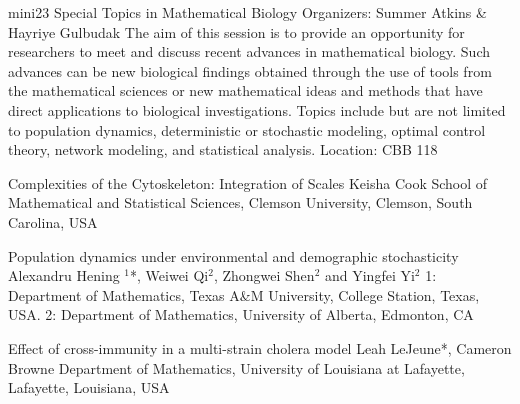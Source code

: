 \mini
{mini23}
{Special Topics in Mathematical Biology}
{Organizers: Summer Atkins \& Hayriye Gulbudak}
{The aim of this session is to provide an opportunity for researchers to meet and discuss recent advances in mathematical biology. Such advances can be new biological findings obtained through the use of tools from the mathematical sciences or  new mathematical ideas and methods that have direct applications to biological investigations. Topics include but are not limited to population dynamics, deterministic or stochastic modeling, optimal control theory, network modeling, and statistical analysis.}
{Location: CBB 118}

\begin{talks}
\item\talk
{Complexities of the Cytoskeleton: Integration of Scales}
{Keisha Cook}
{School of Mathematical and Statistical Sciences, Clemson University, Clemson, South Carolina, USA}
\item\talk
{Population dynamics under environmental and demographic stochasticity}
{Alexandru Hening {$^{1}$*}, Weiwei Qi{$^{2}$}, Zhongwei Shen{$^{2}$} and Yingfei Yi{$^{2}$}}
{1: Department of Mathematics, Texas A\&M University, College Station, Texas, USA. 2: Department of Mathematics,  University of Alberta, Edmonton, CA}
\item\talk
{Effect of cross-immunity in a multi-strain cholera model}
{Leah LeJeune{*}, Cameron Browne}
{Department of Mathematics, University of Louisiana at Lafayette, Lafayette, Louisiana, USA}
\end{talks}
\room
